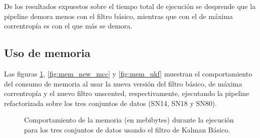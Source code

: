 De los resultados expuestos sobre el tiempo total de ejecuci\'on se desprende que la pipeline demora menos con el filtro b\'asico, mientras que con el de m\'axima correntrop\'ia es con el que m\'as se demora.

\subsection{Uso de memoria}
Las figuras \ref{fig:mem_new_kbf}, \ref{fig:mem_new_mcc} y \ref{fig:mem_ukf} muestran el comportamiento del consumo de memoria al usar la nueva versi\'on del filtro b\'asico, de m\'axima correntrop\'ia y el nuevo filtro unscented, respectivamente, ejecutando la pipeline refactorizada sobre los tres conjuntos de datos (SN14, SN18 y SN80). 

\begin{figure}[h!]
\centering
{}\hfill
{}\vfill
{}
\caption{Comportamiento de la memoria (en mebibytes) durante la ejecuci\'on para los tres conjuntos de datos usando el filtro de Kalman B\'asico.}
\label{fig:mem_new_kbf}
\end{figure}

